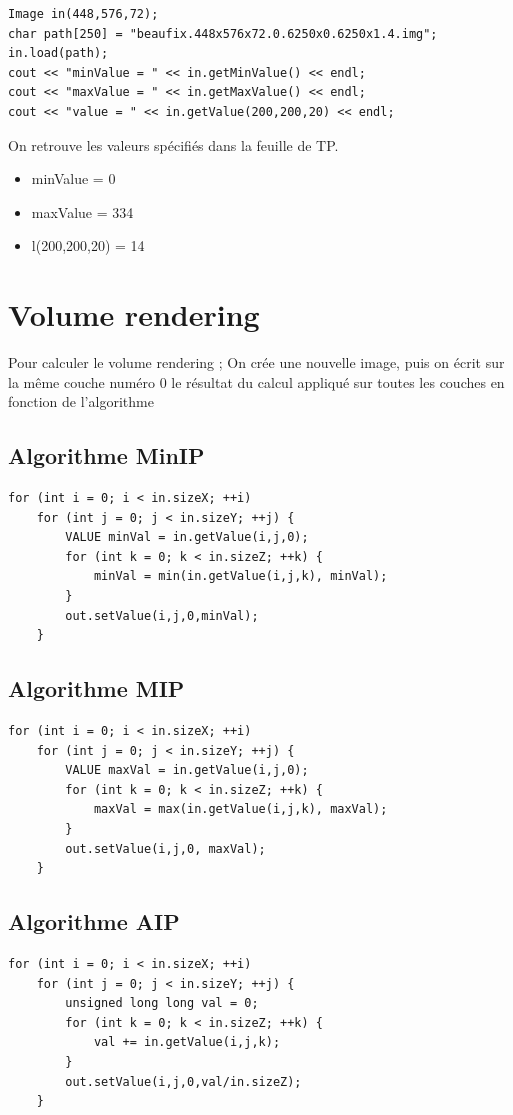 \documentclass[a4paper,11pt]{article}
\begin{document}
\begin{lstlisting}
Image in(448,576,72);
char path[250] = "beaufix.448x576x72.0.6250x0.6250x1.4.img";
in.load(path);
cout << "minValue = " << in.getMinValue() << endl;
cout << "maxValue = " << in.getMaxValue() << endl;
cout << "value = " << in.getValue(200,200,20) << endl;
\end{lstlisting}

On retrouve les valeurs spécifiés dans la feuille de TP.

\begin{itemize}
  \item minValue = 0
  \item maxValue = 334
  \item l(200,200,20) = 14
\end{itemize}

\section{Volume rendering}
Pour calculer le volume rendering ; On crée une nouvelle image, puis on écrit sur la même couche numéro 0 le résultat du calcul appliqué sur toutes les couches en fonction de l'algorithme

\subsection{Algorithme MinIP}
\begin{lstlisting}
for (int i = 0; i < in.sizeX; ++i)
	for (int j = 0; j < in.sizeY; ++j) {
		VALUE minVal = in.getValue(i,j,0);
		for (int k = 0; k < in.sizeZ; ++k) {
			minVal = min(in.getValue(i,j,k), minVal);
		}
		out.setValue(i,j,0,minVal);
	}
\end{lstlisting}

\subsection{Algorithme MIP}
\begin{lstlisting}
for (int i = 0; i < in.sizeX; ++i)
	for (int j = 0; j < in.sizeY; ++j) {
		VALUE maxVal = in.getValue(i,j,0);
		for (int k = 0; k < in.sizeZ; ++k) {
			maxVal = max(in.getValue(i,j,k), maxVal);
		}
		out.setValue(i,j,0, maxVal);
	}
\end{lstlisting}

\subsection{Algorithme AIP}
\begin{lstlisting}
for (int i = 0; i < in.sizeX; ++i)
	for (int j = 0; j < in.sizeY; ++j) {
		unsigned long long val = 0;
		for (int k = 0; k < in.sizeZ; ++k) {
			val += in.getValue(i,j,k);
		}
		out.setValue(i,j,0,val/in.sizeZ);
	}
\end{lstlisting}
\end{document}
